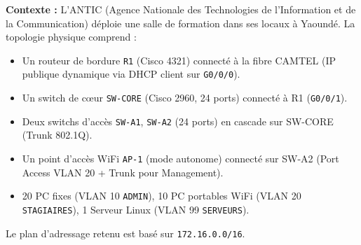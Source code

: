 \documentclass[11pt]{article}
\begin{document}
\begin{exoresolu}
\textbf{Contexte :} L'ANTIC (Agence Nationale des Technologies de l'Information et de la Communication) déploie une salle de formation dans ses locaux à Yaoundé. La topologie physique comprend :
\begin{itemize}
    \item Un routeur de bordure \texttt{R1} (Cisco 4321) connecté à la fibre CAMTEL (IP publique dynamique via DHCP client sur \texttt{G0/0/0}).
    \item Un switch de cœur \texttt{SW-CORE} (Cisco 2960, 24 ports) connecté à R1 (\texttt{G0/0/1}).
    \item Deux switchs d'accès \texttt{SW-A1}, \texttt{SW-A2} (24 ports) en cascade sur SW-CORE (Trunk 802.1Q).
    \item Un point d'accès WiFi \texttt{AP-1} (mode autonome) connecté sur SW-A2 (Port Access VLAN 20 + Trunk pour Management).
    \item 20 PC fixes (VLAN 10 \texttt{ADMIN}), 10 PC portables WiFi (VLAN 20 \texttt{STAGIAIRES}), 1 Serveur Linux (VLAN 99 \texttt{SERVEURS}).
\end{itemize}
Le plan d'adressage retenu est basé sur \texttt{172.16.0.0/16}.


\end{exoresolu}
\end{document}
